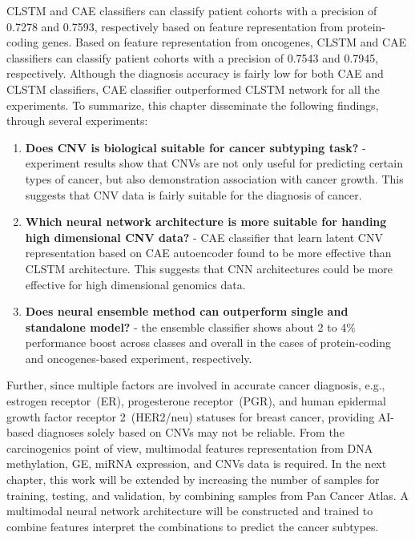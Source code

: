 \hspace*{3.5mm} CLSTM and CAE classifiers can classify patient cohorts with a precision of 0.7278 and 0.7593, respectively based on feature representation from protein-coding genes. Based on feature representation from oncogenes, CLSTM and CAE classifiers can classify patient cohorts with a precision of 0.7543 and 0.7945, respectively. Although the diagnosis accuracy is fairly low for both CAE and CLSTM classifiers, CAE classifier outperformed CLSTM network for all the experiments. To summarize, this chapter disseminate the following findings, through several experiments:  

\begin{enumerate}[noitemsep]
    \item \textbf{Does CNV is biological suitable for cancer subtyping task?} - experiment results show that CNVs are not only useful for predicting certain types of cancer, but also demonstration association with cancer growth. This suggests that CNV data is fairly suitable for the diagnosis of cancer. 
    \item \textbf{Which neural network architecture is more suitable for handing high dimensional CNV data?} - CAE classifier that learn latent CNV representation based on CAE autoencoder found to be more effective than CLSTM architecture. This suggests that CNN architectures could be more effective for high dimensional genomics data.   
    \item \textbf{Does neural ensemble method can outperform single and standalone model?} - the ensemble classifier shows about 2 to 4\% performance boost across classes and overall in the cases of protein-coding and oncogenes-based experiment, respectively. 
\end{enumerate}

\hspace*{3.5mm} Further, since multiple factors are involved in accurate cancer diagnosis, e.g., estrogen receptor~(ER), progesterone receptor~(PGR), and human epidermal growth factor receptor 2~(HER2/neu) statuses for breast cancer, providing AI-based diagnoses solely based on CNVs may not be reliable. From the carcinogenics point of view, multimodal features representation from DNA methylation, GE, miRNA expression, and CNVs data is required. 
In the next chapter, this work will be extended by increasing the number of samples for training, testing, and validation, by combining samples from Pan Cancer Atlas. A multimodal neural network architecture will be constructed and trained to combine features interpret the combinations to predict the cancer subtypes. 

